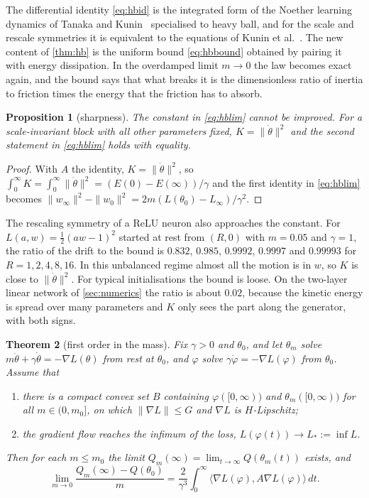 \documentclass[11pt]{article}
\newtheorem{theorem}{Theorem}
\newtheorem{proposition}[theorem]{Proposition}
\theoremstyle{remark}
\theoremstyle{definition}
\newcommand{\ip}[2]{\langle #1,#2\rangle}
\begin{document}
The differential identity \eqref{eq:hbid} is the integrated form of the Noether learning dynamics of Tanaka and Kunin~\cite{tanaka2021} specialised to heavy ball, and for the scale and rescale symmetries it is equivalent to the equations of Kunin et al.~\cite{kunin2021}. The new content of \cref{thm:hb} is the uniform bound \eqref{eq:hbbound} obtained by pairing it with energy dissipation. In the overdamped limit $m\to0$ the law becomes exact again, and the bound says that what breaks it is the dimensionless ratio of inertia to friction times the energy that the friction has to absorb.

\begin{proposition}[sharpness]\label{prop:sharp}
The constant in \eqref{eq:hblim} cannot be improved. For a scale-invariant block with all other parameters fixed, $K=\|\dot\theta\|^2$ and the second statement in \eqref{eq:hblim} holds with equality.
\end{proposition}

\begin{proof}
With $A$ the identity, $K=\|\dot\theta\|^2$, so $\int_0^\infty K=\int_0^\infty\|\dot\theta\|^2=(E(0)-E(\infty))/\gamma$ and the first identity in \eqref{eq:hblim} becomes $\|w_\infty\|^2-\|w_0\|^2=2m(L(\theta_0)-L_\infty)/\gamma^2$.
\end{proof}

The rescaling symmetry of a ReLU neuron also approaches the constant. For $L(a,w)=\tfrac12(aw-1)^2$ started at rest from $(R,0)$ with $m=0.05$ and $\gamma=1$, the ratio of the drift to the bound is $0.832$, $0.985$, $0.9992$, $0.9997$ and $0.99993$ for $R=1,2,4,8,16$. In this unbalanced regime almost all the motion is in $w$, so $K$ is close to $\|\dot\theta\|^2$. For typical initialisations the bound is loose. On the two-layer linear network of \cref{sec:numerics} the ratio is about $0.02$, because the kinetic energy is spread over many parameters and $K$ only sees the part along the generator, with both signs.

\begin{theorem}[first order in the mass]\label{thm:first}
Fix $\gamma>0$ and $\theta_0$, and let $\theta_m$ solve $m\ddot\theta+\gamma\dot\theta=-\nabla L(\theta)$ from rest at $\theta_0$, and $\varphi$ solve $\gamma\dot\varphi=-\nabla L(\varphi)$ from $\theta_0$. Assume that
\begin{enumerate}
\item[(H1)] there is a compact convex set $B$ containing $\varphi([0,\infty))$ and $\theta_m([0,\infty))$ for all $m\in(0,m_0]$, on which $\|\nabla L\|\le G$ and $\nabla L$ is $H$-Lipschitz;
\item[(H2)] the gradient flow reaches the infimum of the loss, $L(\varphi(t))\to L_*:=\inf L$.
\end{enumerate}
Then for each $m\le m_0$ the limit $Q_m(\infty)=\lim_{t\to\infty}Q(\theta_m(t))$ exists, and
\[
\lim_{m\to0}\frac{Q_m(\infty)-Q(\theta_0)}{m}=\frac{2}{\gamma^3}\int_0^\infty\ip{\nabla L(\varphi)}{A\nabla L(\varphi)}\,dt .
\]
\end{theorem}
\end{document}
